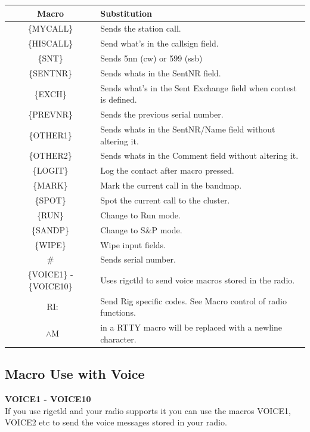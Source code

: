 \documentclass{article}
\begin{document}
\vspace{0.5cm}
\begin{tabular}{| c | p{9cm} |}
    \hline
    \textbf{Macro} & \textbf{Substitution} \\
    \hline
    \{MYCALL\} & Sends the station call. \\
    \hline
    \{HISCALL\} & Send what's in the callsign field. \\
    \hline
    \{SNT\} & Sends 5nn (cw) or 599 (ssb) \\
    \hline
    \{SENTNR\} & Sends whats in the SentNR field. \\
    \hline
    \{EXCH\} & Sends what's in the Sent Exchange field when contest is defined. \\
    \hline
    \{PREVNR\} & Sends the previous serial number. \\
    \hline
    \{OTHER1\} & Sends whats in the SentNR/Name field without altering it. \\
    \hline
    \{OTHER2\} & Sends whats in the Comment field without altering it. \\
    \hline
    \{LOGIT\} & Log the contact after macro pressed. \\
    \hline
    \{MARK\} & Mark the current call in the bandmap. \\
    \hline
    \{SPOT\} & Spot the current call to the cluster. \\
    \hline
    \{RUN\} & Change to Run mode. \\
    \hline
    \{SANDP\} & Change to S\&P mode. \\
    \hline
    \{WIPE\} & Wipe input fields. \\
    \hline
    \# & Sends serial number. \\
    \hline
    \{VOICE1\} - \{VOICE10\} & Uses rigctld to send voice macros stored in the radio. \\
    \hline
    \ RI: & Send Rig specific codes. See Macro control of radio functions. \\
    \hline
    \ $\wedge$M & 	in a RTTY macro will be replaced with a newline character. \\
    \hline
\end{tabular}

\subsection{Macro Use with Voice}
\textbf{{VOICE1} - {VOICE10}}\\
If you use rigctld and your radio supports it you can use the macros {VOICE1}, {VOICE2} etc to send the voice messages stored in your radio.
\end{document}
